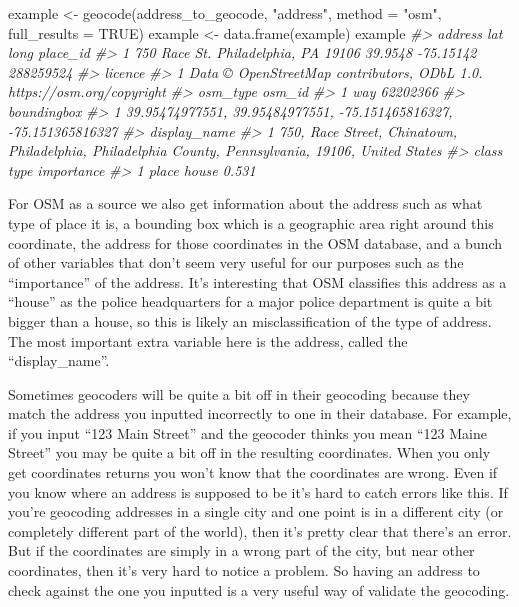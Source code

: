 \documentclass[
]{krantz}
\makeatletter
\newenvironment{Shaded}{\begin{snugshade}}{\end{snugshade}}
\newcommand{\AttributeTok}[1]{\textcolor[rgb]{0.61,0.61,0.61}{#1}}
\newcommand{\CommentTok}[1]{\textcolor[rgb]{0.37,0.37,0.37}{\textit{#1}}}
\newcommand{\ConstantTok}[1]{\textcolor[rgb]{0,0,0}{#1}}
\newcommand{\FunctionTok}[1]{\textcolor[rgb]{0,0,0}{#1}}
\newcommand{\NormalTok}[1]{#1}
\newcommand{\OtherTok}[1]{\textcolor[rgb]{0.37,0.37,0.37}{#1}}
\newcommand{\StringTok}[1]{\textcolor[rgb]{0.5,0.5,0.5}{#1}}
\newenvironment{kframe}{%
\medskip{}
\setlength{\fboxsep}{.8em}
 \def\at@end@of@kframe{}%
 \ifinner\ifhmode%
  \def\at@end@of@kframe{\end{minipage}}%
  \begin{minipage}{\columnwidth}%
 \fi\fi%
 \def\FrameCommand##1{\hskip\@totalleftmargin \hskip-\fboxsep
 \colorbox{shadecolor}{##1}\hskip-\fboxsep
     \hskip-\linewidth \hskip-\@totalleftmargin \hskip\columnwidth}%
 \MakeFramed {\advance\hsize-\width
   \@totalleftmargin\z@ \linewidth\hsize
   \@setminipage}}%
 {\par\unskip\endMakeFramed%
 \at@end@of@kframe}
\renewenvironment{Shaded}{\begin{kframe}}{\end{kframe}}
\makeatother
\begin{document}
\begin{Shaded}
\begin{Highlighting}[]
\NormalTok{example }\OtherTok{\textless{}{-}} \FunctionTok{geocode}\NormalTok{(address\_to\_geocode, }\StringTok{"address"}\NormalTok{, }\AttributeTok{method =} \StringTok{"osm"}\NormalTok{, }\AttributeTok{full\_results =} \ConstantTok{TRUE}\NormalTok{)}
\NormalTok{example }\OtherTok{\textless{}{-}} \FunctionTok{data.frame}\NormalTok{(example)}
\NormalTok{example}
\CommentTok{\#\textgreater{}                               address     lat      long  place\_id}
\CommentTok{\#\textgreater{} 1 750 Race St. Philadelphia, PA 19106 39.9548 {-}75.15142 288259524}
\CommentTok{\#\textgreater{}                                                                  licence}
\CommentTok{\#\textgreater{} 1 Data © OpenStreetMap contributors, ODbL 1.0. https://osm.org/copyright}
\CommentTok{\#\textgreater{}   osm\_type   osm\_id}
\CommentTok{\#\textgreater{} 1      way 62202366}
\CommentTok{\#\textgreater{}                                                          boundingbox}
\CommentTok{\#\textgreater{} 1 39.95474977551, 39.95484977551, {-}75.151465816327, {-}75.151365816327}
\CommentTok{\#\textgreater{}                                                                                         display\_name}
\CommentTok{\#\textgreater{} 1 750, Race Street, Chinatown, Philadelphia, Philadelphia County, Pennsylvania, 19106, United States}
\CommentTok{\#\textgreater{}   class  type importance}
\CommentTok{\#\textgreater{} 1 place house      0.531}
\end{Highlighting}
\end{Shaded}

For OSM as a source we also get information about the address such as what type of place it is, a bounding box which is a geographic area right around this coordinate, the address for those coordinates in the OSM database, and a bunch of other variables that don't seem very useful for our purposes such as the ``importance'' of the address. It's interesting that OSM classifies this address as a ``house'' as the police headquarters for a major police department is quite a bit bigger than a house, so this is likely an misclassification of the type of address. The most important extra variable here is the address, called the ``display\_name''.

Sometimes geocoders will be quite a bit off in their geocoding because they match the address you inputted incorrectly to one in their database. For example, if you input ``123 Main Street'' and the geocoder thinks you mean ``123 Maine Street'' you may be quite a bit off in the resulting coordinates. When you only get coordinates returns you won't know that the coordinates are wrong. Even if you know where an address is supposed to be it's hard to catch errors like this. If you're geocoding addresses in a single city and one point is in a different city (or completely different part of the world), then it's pretty clear that there's an error. But if the coordinates are simply in a wrong part of the city, but near other coordinates, then it's very hard to notice a problem. So having an address to check against the one you inputted is a very useful way of validate the geocoding.
\end{document}

